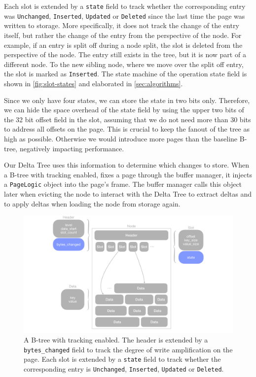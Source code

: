 Each slot is extended by a \texttt{state} field to track whether the corresponding entry was \texttt{Unchanged}, \texttt{Inserted}, \texttt{Updated} or \texttt{Deleted} since the last time the page was written to storage.
More specifically, it does not track the change of the entry itself, but rather the change of the entry from the perspective of the node.
For example, if an entry is split off during a node split, the slot is deleted from the perspective of the node.
The entry still exists in the tree, but it is now part of a different node.
To the new sibling node, where we move over the split off entry, the slot is marked as \texttt{Inserted}.
The state machine of the operation state field is shown in \autoref{fig:slot-states} and elaborated in \autoref{sec:algorithms}.

Since we only have four states, we can store the state in two bits only.
Therefore, we can hide the space overhead of the state field by using the upper two bits of the 32 bit offset field in the slot, assuming that we do not need more than 30 bits to address all offsets on the page.
This is crucial to keep the fanout of the tree as high as possible. Otherwise we would introduce more pages than the baseline B-tree, negatively impacting performance.

Our Delta Tree uses this information to determine which changes to store.
When a B-tree with tracking enabled, fixes a page through the buffer manager, it injects a \texttt{PageLogic} object into the page's frame.
The buffer manager calls this object later when evicting the node to interact with the Delta Tree to extract deltas and to apply deltas when loading the node from storage again.

\begin{figure}[htbp]
  \centering
  \includegraphics[width=1\textwidth]{figures/b_tree_with_tracking.pdf}
  \caption{A B-tree with tracking enabled. The header is extended by a \texttt{bytes\_changed} field to track the degree of write amplification on the page. Each slot is extended by a \texttt{state} field to track whether the corresponding entry is \texttt{Unchanged}, \texttt{Inserted}, \texttt{Updated} or \texttt{Deleted}.}
  \label{fig:B-tree-with-tracking}
\end{figure}

